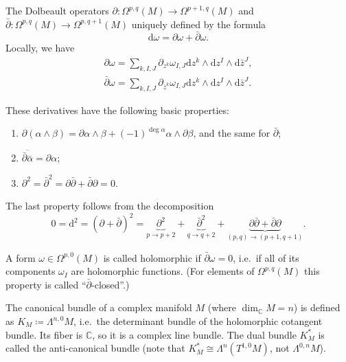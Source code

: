 \documentclass[english,letterpaper]{article}%
\numberwithin{equation}{section}
\numberwithin{figure}{section}
\numberwithin{table}{section}
\theoremstyle{definition}
\theoremstyle{definition}
\theoremstyle{definition}
\theoremstyle{plain}
\theoremstyle{plain}
\theoremstyle{plain}
\theoremstyle{plain}
\theoremstyle{remark}
\theoremstyle{remark}
\newcommand{\dd}{{\mathrm{d}}}
\begin{document}
\begin{defn}
    The Dolbeault operators $\partial:\Omega^{p,q}(M)\to\Omega^{p+1,q}(M)$ and $\bar\partial:\Omega^{p,q}(M)\to\Omega^{p,q+1}(M)$ uniquely defined by the formula
    \[\dd\omega=\partial\omega+\bar\partial\omega.\]
    Locally, we have 
    \begin{align}
        \partial\omega=\sum_{k,I,J}\partial_{z^k}\omega_{I,J}\dd z^k\wedge\dd z^I\wedge \dd\bar z^J,\\
        \bar\partial\omega=\sum_{k,I,J}\partial_{\bar z^k}\omega_{I,J}\dd z^k\wedge\dd z^I\wedge \dd\bar z^J.
    \end{align}
\end{defn}

These derivatives have the following basic properties:
\begin{enumerate}
    \item $\partial(\alpha\wedge\beta)=\partial\alpha\wedge\beta+(-1)^{\deg\alpha}\alpha\wedge\partial\beta$, and the same for $\bar\partial$;
    \item $\overline{\bar\partial\bar\alpha}=\partial\alpha$;
    \item $\partial^2=\bar\partial^2=\partial\bar\partial+\bar\partial\partial=0.$
\end{enumerate}
The last property follows from the decomposition \[0=\dd^2=(\partial+\bar\partial)^2=\underbrace{\partial^2}_{p\to p+2}+\underbrace{\bar\partial^2}_{q\to q+2}+\underbrace{\partial\bar\partial+\bar\partial\partial}_{(p,q)\to(p+1,q+1)}.\]


\begin{defn}
    A form $\omega\in\Omega^{p,0}(M)$ is called holomorphic if $\bar\partial\omega=0$, i.e.\ if all of its components $\omega_I$ are holomorphic functions. (For elements of $\Omega^{p,q}(M)$ this property is called ``$\bar\partial$-closed''.)
\end{defn}

\begin{defn}
    The canonical bundle of a complex manifold $M$ (where $\dim_\mathbb{C} M=n$) is defined as $K_M\coloneqq \Lambda^{n,0}M$, i.e.\ the determinant bundle of the holomorphic cotangent bundle. Its fiber is $\mathbb{C}$, so it is a complex line bundle. The dual bundle $K^\ast_M$ is called the anti-canonical bundle (note that $K^\ast_M\cong \Lambda^n(T^{1,0}M)$, not $\Lambda^{0,n}M$).
\end{defn}
\end{document}
